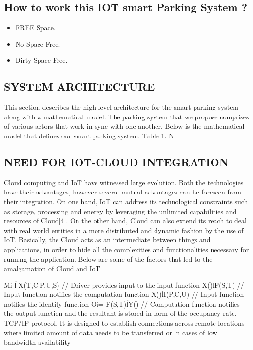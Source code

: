 \documentclass[conference]{IEEEtran}
\begin{document}
\subsection{How to work this IOT smart Parking System ?}\label{SCM}
\begin{itemize}

\item FREE Space.
\item No Space Free.
\item Dirty Space Free.
\end{itemize}

\subsection{SYSTEM ARCHITECTURE}
This section describes the high level architecture for the smart
parking system along with a mathematical model. The parking
system that we propose comprises of various actors that work
in sync with one another. Below is the mathematical model that
defines our smart parking system.
Table 1: N
\subsection{NEED FOR IOT-CLOUD INTEGRATION}
Cloud computing and IoT have witnessed large evolution. Both
the technologies have their advantages, however several mutual
advantages can be foreseen from their integration. On one
hand, IoT can address its technological constraints such as
storage, processing and energy by leveraging the unlimited
capabilities and resources of Cloud[4]. On the other hand,
Cloud can also extend its reach to deal with real world entities
in a more distributed and dynamic fashion by the use of IoT.
Basically, the Cloud acts as an intermediate between things and
applications, in order to hide all the complexities and
functionalities necessary for running the application. Below are
some of the factors that led to the amalgamation of Cloud and
IoT

Mi ĺ X(T,C,P,U,S) // Driver provides input to the input
function
X()ĺF(S,T) // Input function notifies the computation
function
X()ĺI(P,C,U) // Input function notifies the identity function
Oi= F(S,T)ĺY() // Computation function notifies the output
function and the resultant is stored in form of the occupancy
rate.
TCP/IP protocol. It is designed to establish
connections across remote locations where limited
amount of data needs to be transferred or in cases of
low bandwidth availability
\end{document}
